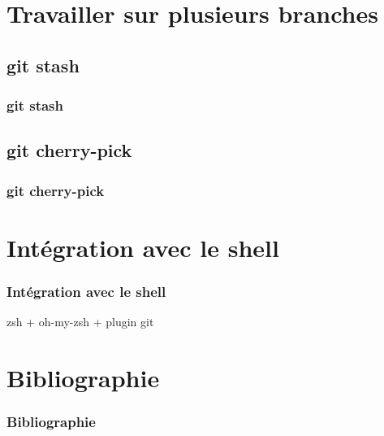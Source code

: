 \documentclass[t,11pt]{beamer}
\begin{document}
\section{Travailler sur plusieurs branches}
\subsection{git stash}
\begin{frame}
        \frametitle{git stash}
\end{frame}

\subsection{git cherry-pick}
\begin{frame}
        \frametitle{git cherry-pick}
\end{frame}

\section{Int\'egration avec le shell}
\begin{frame}
        \frametitle{Int\'egration avec le shell}
        zsh + oh-my-zsh + plugin git
\end{frame}

\section{Bibliographie}
\begin{frame}
        \frametitle{Bibliographie}
\end{frame}
\end{document}
